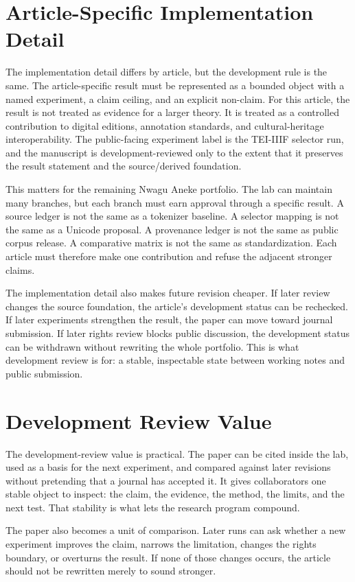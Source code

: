 \documentclass[sigconf,nonacm]{acmart}
\begin{document}
\section{Article-Specific Implementation Detail}
The implementation detail differs by article, but the development rule is the same.
The article-specific result must be represented as a bounded object with a named
experiment, a claim ceiling, and an explicit non-claim. For this article, the
result is not treated as evidence for a larger theory. It is treated as a
controlled contribution to digital editions, annotation standards, and cultural-heritage interoperability. The public-facing experiment label is the TEI-IIIF selector run, and the manuscript is development-reviewed only to the extent that it preserves the result
statement and the source/derived foundation.

This matters for the remaining Nwagu Aneke portfolio. The lab can maintain many
branches, but each branch must earn approval through a specific result. A source
ledger is not the same as a tokenizer baseline. A selector mapping is not the
same as a Unicode proposal. A provenance ledger is not the same as public corpus
release. A comparative matrix is not the same as standardization. Each article
must therefore make one contribution and refuse the adjacent stronger claims.

The implementation detail also makes future revision cheaper. If later review
changes the source foundation, the article's development status can be
rechecked. If later experiments strengthen the result, the paper can move toward
journal submission. If later rights review blocks public discussion, the
development status can be withdrawn without rewriting the whole portfolio. This
is what development review is for: a stable, inspectable state between working
notes and public submission.

\section{Development Review Value}
The development-review value is practical. The paper can be cited inside the lab,
used as a basis for the next experiment, and compared against later revisions
without pretending that a journal has accepted it. It gives collaborators one
stable object to inspect: the claim, the evidence, the method, the limits, and
the next test. That stability is what lets the research program compound.

The paper also becomes a unit of comparison. Later runs can ask whether a new
experiment improves the claim, narrows the limitation, changes the rights
boundary, or overturns the result. If none of those changes occurs, the article
should not be rewritten merely to sound stronger.
\end{document}
